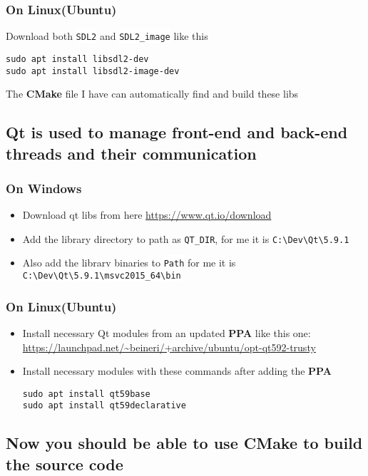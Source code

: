 \documentclass[a4paper,12pt]{article}
\let\OldTexttt\texttt
\renewcommand{\texttt}[1]{\OldTexttt{\footnotesize\colorbox{background}{\textcolor{foreground}{#1}}}}
\begin{document}
\subsubsection{On Linux(Ubuntu)}
\label{sec:orga96cd07}

Download both \texttt{SDL2} and \texttt{SDL2\_image} like this
\lstset{language=sh,label= ,caption= ,captionpos=b,numbers=none,language=cpp}
\begin{lstlisting}
sudo apt install libsdl2-dev
sudo apt install libsdl2-image-dev
\end{lstlisting}

The \textbf{CMake} file I have can automatically find and build these libs

\subsection{Qt is used to manage front-end and back-end threads and their communication}
\label{sec:orgb528a9c}
\subsubsection{On Windows}
\label{sec:org05ce9b9}
\begin{itemize}
\item Download qt libs from here \url{https://www.qt.io/download}
\item Add the library directory to path as \texttt{QT\_DIR}, for me it is \texttt{C:\textbackslash{}Dev\textbackslash{}Qt\textbackslash{}5.9.1}
\item Also add the library binaries to \texttt{Path} for me it is \texttt{C:\textbackslash{}Dev\textbackslash{}Qt\textbackslash{}5.9.1\textbackslash{}msvc2015\_64\textbackslash{}bin}
\end{itemize}

\subsubsection{On Linux(Ubuntu)}
\label{sec:orgc5fc946}

\begin{itemize}
\item Install necessary Qt modules from an updated \textbf{PPA} like this one: \url{https://launchpad.net/\~beineri/+archive/ubuntu/opt-qt592-trusty}
\item Install necessary modules with these commands after adding the \textbf{PPA}
\lstset{language=sh,label= ,caption= ,captionpos=b,numbers=none,language=cpp}
\begin{lstlisting}
sudo apt install qt59base
sudo apt install qt59declarative
\end{lstlisting}
\end{itemize}

\subsection{Now you should be able to use CMake to build the source code}
\label{sec:org94cd16d}
\end{document}
